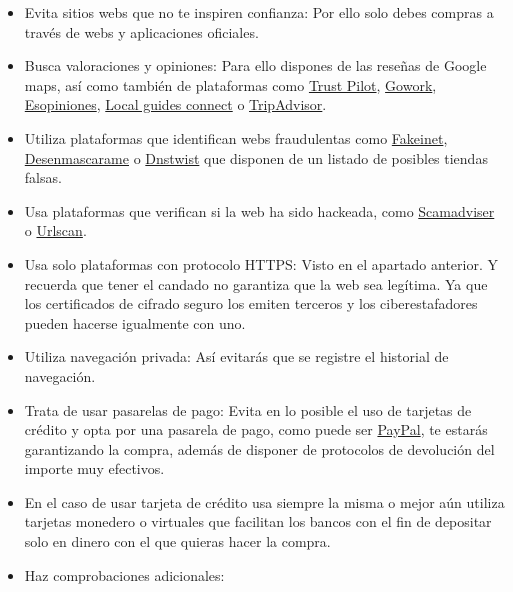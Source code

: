\documentclass[
  a4paper,
  openany]{book}
\begin{document}
\begin{itemize}
\item
  Evita sitios webs que no te inspiren confianza: Por ello solo debes compras a través de webs y aplicaciones oficiales.
\item
  Busca valoraciones y opiniones: Para ello dispones de las reseñas de Google maps, así como también de plataformas como \href{https://es.trustpilot.com/}{Trust Pilot}, \href{https://es.gowork.com/}{Gowork}, \href{https://esopiniones.com/}{Esopiniones}, \href{https://www.localguidesconnect.com/}{Local guides connect} o \href{https://www.tripadvisor.es/}{TripAdvisor}.
\item
  Utiliza plataformas que identifican webs fraudulentas como \href{https://fakeinet.com/}{Fakeinet}, \href{https://desenmascara.me/}{Desenmascarame} o \href{https://dnstwist.it/}{Dnstwist} que disponen de un listado de posibles tiendas falsas.
\item
  Usa plataformas que verifican si la web ha sido hackeada, como \href{https://www.scamadviser.com/}{Scamadviser} o \href{https://urlscan.io/}{Urlscan}.
\item
  Usa solo plataformas con protocolo HTTPS: Visto en el apartado anterior. Y recuerda que tener el candado no garantiza que la web sea legítima. Ya que los certificados de cifrado seguro los emiten terceros y los ciberestafadores pueden hacerse igualmente con uno.
\item
  Utiliza navegación privada: Así evitarás que se registre el historial de navegación.
\item
  Trata de usar pasarelas de pago: Evita en lo posible el uso de tarjetas de crédito y opta por una pasarela de pago, como puede ser \href{https://www.paypal.com/es/home}{PayPal}, te estarás garantizando la compra, además de disponer de protocolos de devolución del importe muy efectivos.
\item
  En el caso de usar tarjeta de crédito usa siempre la misma o mejor aún utiliza tarjetas monedero o virtuales que facilitan los bancos con el fin de depositar solo en dinero con el que quieras hacer la compra.
\item
  Haz comprobaciones adicionales:


\end{itemize}
\end{document}
